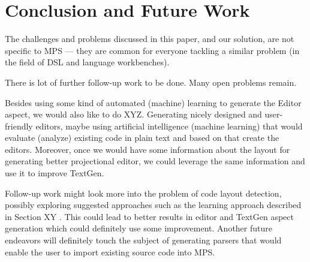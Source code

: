 \section{Conclusion and Future Work}

 The challenges and problems discussed in this paper, and our solution, are not specific to MPS --- they are common for everyone tackling a similar problem (in the field of DSL and language workbenches).


There is lot of further follow-up work to be done. Many open problems remain.

Besides using some kind of automated (machine) learning to generate the Editor aspect, we would also like to do XYZ.
Generating nicely designed and user-friendly editors, maybe using artificial intelligence (machine learning) that would evaluate (analyze) existing code in plain text and based on that create the editors.
Moreover, once we would have some information about the layout for generating better projectional editor, we could leverage the same information and use it to improve TextGen.

Follow-up work might look more into the problem of code layout detection, possibly exploring suggested approaches such as the learning approach described in Section XY .
This could lead to better results in editor and TextGen aspect generation which could definitely use some improvement.
Another future endeavors will definitely touch the subject of generating parsers that would enable the user to import existing source code into MPS.
